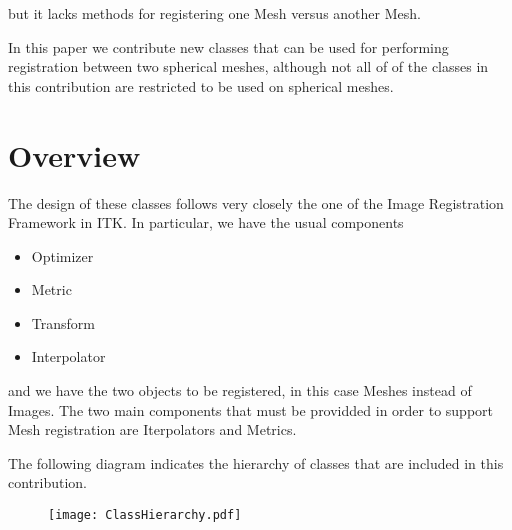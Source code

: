 \documentclass{InsightArticle}
\begin{document}
but it lacks methods for registering one Mesh versus another Mesh.

In this paper we contribute new classes that can be used for performing
registration between two spherical meshes, although not all of of the classes
in this contribution are restricted to be used on spherical meshes.

\section{Overview}

The design of these classes follows very closely the one of the Image
Registration Framework in ITK.  In particular, we have the usual components

\begin{itemize}
\item Optimizer
\item Metric
\item Transform
\item Interpolator
\end{itemize}

and we have the two objects to be registered, in this case Meshes instead of
Images. The two main components that must be providded in order to support Mesh
registration are Iterpolators and Metrics.

The following diagram indicates the hierarchy of classes that are included 
in this contribution.

\begin{figure}
\center
\texttt{[image: ClassHierarchy.pdf]}
\label{fig:ClassHierarchy}
\end{figure}
\end{document}
